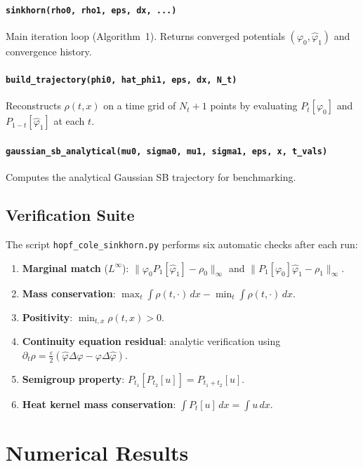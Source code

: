 \documentclass[11pt,a4paper]{article}
\newcommand{\eps}{\varepsilon}
\newcommand{\Pt}[1]{P_{#1}}   %
\begin{document}
\paragraph{\texttt{sinkhorn(rho0, rho1, eps, dx, ...)}}
Main iteration loop (Algorithm~1). Returns converged potentials
$(\varphi_0, \hat\varphi_1)$ and convergence history.

\paragraph{\texttt{build\_trajectory(phi0, hat\_phi1, eps, dx, N\_t)}}
Reconstructs $\rho(t, x)$ on a time grid of $N_t + 1$ points by evaluating
$\Pt{t}[\varphi_0]$ and $\Pt{1-t}[\hat\varphi_1]$ at each $t$.

\paragraph{\texttt{gaussian\_sb\_analytical(mu0, sigma0, mu1, sigma1, eps, x, t\_vals)}}
Computes the analytical Gaussian SB trajectory for benchmarking.

\subsection{Verification Suite}

The script \texttt{hopf\_cole\_sinkhorn.py} performs six automatic checks
after each run:
\begin{enumerate}
  \item \textbf{Marginal match} ($L^\infty$): $\|\varphi_0 \Pt{1}[\hat\varphi_1] - \rho_0\|_\infty$
        and $\|\Pt{1}[\varphi_0]\hat\varphi_1 - \rho_1\|_\infty$.
  \item \textbf{Mass conservation}: $\max_t\!\int\rho(t,\cdot)\,dx -
        \min_t\!\int\rho(t,\cdot)\,dx$.
  \item \textbf{Positivity}: $\min_{t,x}\rho(t,x) > 0$.
  \item \textbf{Continuity equation residual}: analytic verification using
        $\partial_t\rho = \frac\eps 2(\hat\varphi\Delta\varphi - \varphi\Delta\hat\varphi)$.
  \item \textbf{Semigroup property}: $\Pt{t_1}[\Pt{t_2}[u]] = \Pt{t_1+t_2}[u]$.
  \item \textbf{Heat kernel mass conservation}: $\int\Pt{t}[u]\,dx = \int u\,dx$.
\end{enumerate}

\section{Numerical Results}
\end{document}
